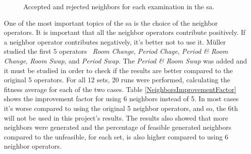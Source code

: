 \begin{figure}[t!]
\centering

\caption{Accepted and rejected neighbors for each examination in the \gls{sa}.} 
\label{fig:AvsRNeighbors}

\end{figure}One of the most important topics of the \gls{sa} is the choice of the neighbor operators. It is important that all the neighbor operators contribute positively. If a neighbor operator contributes negatively, it's better not to use it. M\"{u}ller studied the first 5 operators~\cite{Mueller2009} \textit{Room Change}, \textit{Period Chage}, \textit{Period \& Room Change}, \textit{Room Swap}, and \textit{Period Swap}. The \textit{Period \& Room Swap} was added and it must be studied in order to check if the results are better compared to the original 5 operators. For all 12 sets, 20 runs were performed, calculating the fitness average for each of the two cases. Table \ref{NeighborsImprovementFactor} shows the improvement factor for using 6 neighbors instead of 5. In most cases it's worse compared to using the original 5 neighbor operators, and so, the 6th will not be used in this project's results. The results also showed that more neighbors were generated and the percentage of feasible generated neighbors compared to the unfeasible, for each set, is also higher compared to using 6 neighbor operators.

